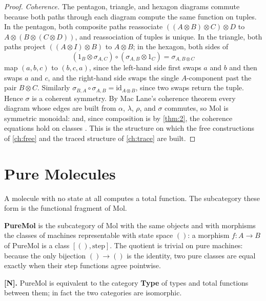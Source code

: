 \begin{proof}
\emph{Coherence.} The pentagon, triangle, and hexagon diagrams commute
because both paths through each diagram compute the same function on tuples.
In the pentagon, both composite paths reassociate
$((A \otimes B) \otimes C) \otimes D$ to
$A \otimes (B \otimes (C \otimes D))$, and reassociation of tuples is unique.
In the triangle, both paths project $((A \otimes I) \otimes B)$ to
$A \otimes B$; in the hexagon, both sides of
\[ (1_B \otimes \sigma_{A,C}) \circ (\sigma_{A,B} \otimes 1_C)
   = \sigma_{A,B \otimes C} \]
map $(a, b, c)$ to $(b, c, a)$, since the left-hand side first swaps $a$ and
$b$ and then swaps $a$ and $c$, and the right-hand side swaps the single
$A$-component past the pair $B \otimes C$. Similarly
$\sigma_{B,A} \circ \sigma_{A,B} = \mathrm{id}_{A \otimes B}$, since two
swaps return the tuple. Hence $\sigma$ is a coherent symmetry. By Mac Lane's
coherence theorem every diagram whose edges are built from $\alpha$, $\lambda$,
$\rho$, and $\sigma$ commutes, so Mol is symmetric monoidal: and, since
composition is by \autoref{thm:2}, the coherence equations hold on classes
\citep{maclane}. This is the structure on which the free constructions of
\autoref{ch:free} and the traced structure of \autoref{ch:trace} are built.
\end{proof}

\section{Pure Molecules}\label{sec:mol-pure}

A molecule with no state at all computes a total function. The subcategory
these form is the functional fragment of Mol.

\begin{definition}[PureMol]\label{def:puremol}
\textbf{PureMol} is the subcategory of Mol with the same objects and with
morphisms the classes of machines representable with state space $()$: a
morphism $f : A \to B$ of PureMol is a class $[(), \mathrm{step}]$. The
quotient is trivial on pure machines: because the only bijection
$() \to ()$ is the identity, two pure classes are equal exactly when their
step functions agree pointwise.
\end{definition}

\begin{theorem}\label{thm:4}
\textbf{[N].} PureMol is equivalent to the category \textbf{Type} of types
and total functions between them; in fact the two categories are isomorphic.
\end{theorem}

